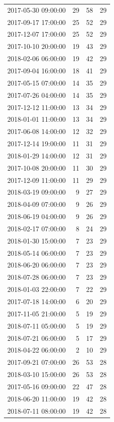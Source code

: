 \begin{tabular}{lrrr}
2017-05-30 09:00:00 & 29 & 58 & 29 \\
2017-09-17 17:00:00 & 25 & 52 & 29 \\
2017-12-07 17:00:00 & 25 & 52 & 29 \\
2017-10-10 20:00:00 & 19 & 43 & 29 \\
2018-02-06 06:00:00 & 19 & 42 & 29 \\
2017-09-04 16:00:00 & 18 & 41 & 29 \\
2017-05-15 07:00:00 & 14 & 35 & 29 \\
2017-07-26 04:00:00 & 14 & 35 & 29 \\
2017-12-12 11:00:00 & 13 & 34 & 29 \\
2018-01-01 11:00:00 & 13 & 34 & 29 \\
2017-06-08 14:00:00 & 12 & 32 & 29 \\
2017-12-14 19:00:00 & 11 & 31 & 29 \\
2018-01-29 14:00:00 & 12 & 31 & 29 \\
2017-10-08 20:00:00 & 11 & 30 & 29 \\
2017-12-09 11:00:00 & 11 & 29 & 29 \\
2018-03-19 09:00:00 & 9 & 27 & 29 \\
2018-04-09 07:00:00 & 9 & 26 & 29 \\
2018-06-19 04:00:00 & 9 & 26 & 29 \\
2018-02-17 07:00:00 & 8 & 24 & 29 \\
2018-01-30 15:00:00 & 7 & 23 & 29 \\
2018-05-14 06:00:00 & 7 & 23 & 29 \\
2018-06-20 06:00:00 & 7 & 23 & 29 \\
2018-07-28 06:00:00 & 7 & 23 & 29 \\
2018-01-03 22:00:00 & 7 & 22 & 29 \\
2017-07-18 14:00:00 & 6 & 20 & 29 \\
2017-11-05 21:00:00 & 5 & 19 & 29 \\
2018-07-11 05:00:00 & 5 & 19 & 29 \\
2018-07-21 06:00:00 & 5 & 17 & 29 \\
2018-04-22 06:00:00 & 2 & 10 & 29 \\
2017-09-21 07:00:00 & 26 & 53 & 28 \\
2018-03-10 15:00:00 & 26 & 53 & 28 \\
2017-05-16 09:00:00 & 22 & 47 & 28 \\
2018-06-20 11:00:00 & 19 & 42 & 28 \\
2018-07-11 08:00:00 & 19 & 42 & 28 \\

\end{tabular}
